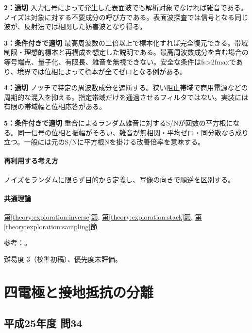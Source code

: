 \noindent\textbf{2：適切} 入力信号によって発生した表面波でも解析対象でなければ雑音である。ノイズは対象に対する不要成分の呼び方である。表面波探査では信号となる同じ波が、反射法では相関した妨害波となり得る。\par

\noindent\textbf{3：条件付きで適切} 最高周波数の二倍以上で標本化すれば完全復元できる。帯域制限・理想的標本と再構成を想定した説明である。最高周波数成分を含む場合の等号端点、量子化、有限長、雑音を無視できない。安全な条件はfs>2fmaxであり、境界では位相によって標本が全てゼロとなる例がある。\par

\noindent\textbf{4：適切} ノッチで特定の周波数成分を遮断する。狭い阻止帯域で商用電源などの周期的な混入を抑える。指定帯域だけを通過させるフィルタではない。実装には有限の帯域幅と位相応答がある。\par

\noindent\textbf{5：条件付きで適切} 重合によるランダム雑音に対するS/Nが回数の平方根になる。同一信号の位相と振幅がそろい、雑音が無相関・平均ゼロ・同分散なら成り立つ。一般には元のS/Nに平方根Nを掛ける改善倍率を意味する。\par

\paragraph{再利用する考え方} ノイズをランダムに限らず目的から定義し、写像の向きで順逆を区別する。

\paragraph{共通理論} \hyperref[theory:exploration:inverse]{第\ref*{theory:exploration:inverse}節}, \hyperref[theory:exploration:stack]{第\ref*{theory:exploration:stack}節}, \hyperref[theory:exploration:sampling]{第\ref*{theory:exploration:sampling}節}

\par 参考：\cite{mit_signals2010,mit_moving2012,scipy_notch,scipy_fft,usgs_processing2000,pygimli_inversion}。

\par 難易度 3（校準初稿）、優先度未評価。

\section{四電極と接地抵抗の分離}

\subsection{平成25年度 問34}
\label{q:h25-reg-applied-34}

